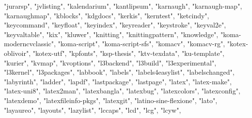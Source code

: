 \documentclass[
]{article}
\newenvironment{Shaded}{\begin{snugshade}}{\end{snugshade}}
\newcommand{\NormalTok}[1]{#1}
\newcommand{\StringTok}[1]{\textcolor[rgb]{0.31,0.60,0.02}{#1}}
\begin{document}
\begin{Shaded}
\begin{Highlighting}[]
\StringTok{"jurarsp"}\NormalTok{, }\StringTok{"jvlisting"}\NormalTok{, }\StringTok{"kalendarium"}\NormalTok{, }\StringTok{"kantlipsum"}\NormalTok{, }\StringTok{"karnaugh"}\NormalTok{, }
\StringTok{"karnaugh{-}map"}\NormalTok{, }\StringTok{"karnaughmap"}\NormalTok{, }\StringTok{"kblocks"}\NormalTok{, }\StringTok{"kdgdocs"}\NormalTok{, }\StringTok{"kerkis"}\NormalTok{, }
\StringTok{"kerntest"}\NormalTok{, }\StringTok{"ketcindy"}\NormalTok{, }\StringTok{"keycommand"}\NormalTok{, }\StringTok{"keyfloat"}\NormalTok{, }\StringTok{"keyindex"}\NormalTok{, }
\StringTok{"keyreader"}\NormalTok{, }\StringTok{"keystroke"}\NormalTok{, }\StringTok{"keyval2e"}\NormalTok{, }\StringTok{"keyvaltable"}\NormalTok{, }\StringTok{"kix"}\NormalTok{, }\StringTok{"kluwer"}\NormalTok{, }
\StringTok{"knitting"}\NormalTok{, }\StringTok{"knittingpattern"}\NormalTok{, }\StringTok{"knowledge"}\NormalTok{, }\StringTok{"koma{-}moderncvclassic"}\NormalTok{, }
\StringTok{"koma{-}script"}\NormalTok{, }\StringTok{"koma{-}script{-}sfs"}\NormalTok{, }\StringTok{"komacv"}\NormalTok{, }\StringTok{"komacv{-}rg"}\NormalTok{, }\StringTok{"kotex{-}oblivoir"}\NormalTok{, }
\StringTok{"kotex{-}utf"}\NormalTok{, }\StringTok{"kpfonts"}\NormalTok{, }\StringTok{"ksp{-}thesis"}\NormalTok{, }\StringTok{"ktv{-}texdata"}\NormalTok{, }\StringTok{"ku{-}template"}\NormalTok{, }
\StringTok{"kurier"}\NormalTok{, }\StringTok{"kvmap"}\NormalTok{, }\StringTok{"kvoptions"}\NormalTok{, }\StringTok{"l3backend"}\NormalTok{, }\StringTok{"l3build"}\NormalTok{, }\StringTok{"l3experimental"}\NormalTok{, }
\StringTok{"l3kernel"}\NormalTok{, }\StringTok{"l3packages"}\NormalTok{, }\StringTok{"labbook"}\NormalTok{, }\StringTok{"labels"}\NormalTok{, }\StringTok{"labels4easylist"}\NormalTok{, }
\StringTok{"labelschanged"}\NormalTok{, }\StringTok{"labyrinth"}\NormalTok{, }\StringTok{"ladder"}\NormalTok{, }\StringTok{"lapdf"}\NormalTok{, }\StringTok{"lastpackage"}\NormalTok{, }
\StringTok{"lastpage"}\NormalTok{, }\StringTok{"latex"}\NormalTok{, }\StringTok{"latex{-}make"}\NormalTok{, }\StringTok{"latex{-}uni8"}\NormalTok{, }\StringTok{"latex2man"}\NormalTok{, }
\StringTok{"latexbangla"}\NormalTok{, }\StringTok{"latexbug"}\NormalTok{, }\StringTok{"latexcolors"}\NormalTok{, }\StringTok{"latexconfig"}\NormalTok{, }\StringTok{"latexdemo"}\NormalTok{, }
\StringTok{"latexfileinfo{-}pkgs"}\NormalTok{, }\StringTok{"latexgit"}\NormalTok{, }\StringTok{"latino{-}sine{-}flexione"}\NormalTok{, }\StringTok{"lato"}\NormalTok{, }
\StringTok{"layaureo"}\NormalTok{, }\StringTok{"layouts"}\NormalTok{, }\StringTok{"lazylist"}\NormalTok{, }\StringTok{"lccaps"}\NormalTok{, }\StringTok{"lcd"}\NormalTok{, }\StringTok{"lcg"}\NormalTok{, }\StringTok{"lcyw"}\NormalTok{, }

\end{Highlighting}
\end{Shaded}
\end{document}
